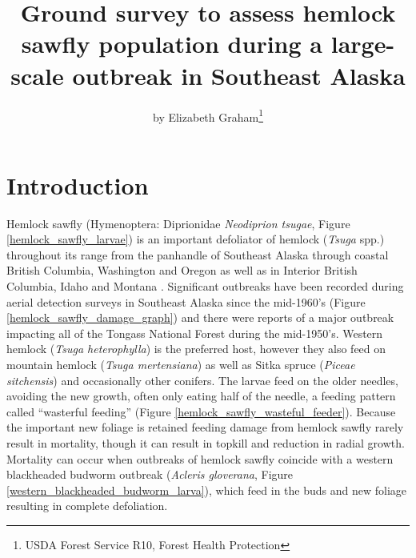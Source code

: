 ﻿\title{Ground survey to assess hemlock sawfly population during a large-scale outbreak in Southeast Alaska}

\subtitle{}

\author{by Elizabeth Graham\footnote{USDA Forest Service R10, Forest Health Protection}}

\maketitle

\section{Introduction}

Hemlock sawfly (Hymenoptera: Diprionidae \textit{Neodiprion tsugae}, Figure \ref{hemlock_sawfly_larvae}) is an important defoliator of hemlock (\textit{Tsuga} spp.)  throughout its range from the panhandle of Southeast Alaska through coastal British Columbia, Washington and Oregon as well as in Interior British Columbia, Idaho and Montana \citep{Hardetal1976}.  Significant outbreaks have been recorded during aerial detection surveys in Southeast Alaska since the mid-1960’s (Figure \ref{hemlock_sawfly_damage_graph}) and there were reports of a major outbreak impacting all of the Tongass National Forest during the mid-1950’s. Western hemlock (\textit{Tsuga heterophylla}) is the preferred host, however they also feed on mountain hemlock (\textit{Tsuga mertensiana}) as well as Sitka spruce (\textit{Piceae sitchensis}) and occasionally other conifers.  The larvae feed on the older needles, avoiding the new growth, often only eating half of the needle, a feeding pattern called “wasterful feeding” (Figure \ref{hemlock_sawfly_wasteful_feeder}).  Because the important new foliage is retained feeding damage from hemlock sawfly rarely result in mortality, though it can result in topkill and reduction in radial growth.  Mortality can occur when outbreaks of hemlock sawfly coincide with a western blackheaded budworm outbreak (\textit{Acleris gloverana}, Figure \ref{western_blackheaded_budworm_larva}), which feed in the buds and new foliage resulting in complete defoliation. 

